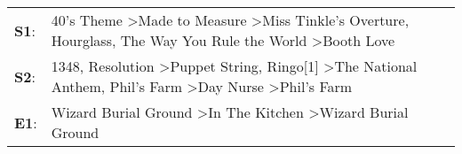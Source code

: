 \begin{supertabular}{p{0.03\textwidth}p{0.92\textwidth}}
 \textbf{S1}:  &                                                                 40's Theme\textsuperscript{} \textgreater \enspace Made to Measure\textsuperscript{} \textgreater \enspace Miss Tinkle's Overture\textsuperscript{}, \enspace Hourglass\textsuperscript{}, \enspace The Way You Rule the World\textsuperscript{} \textgreater \enspace Booth Love\textsuperscript{}  \enspace  \\
 \textbf{S2}:  &  1348\textsuperscript{}, \enspace Resolution\textsuperscript{} \textgreater \enspace Puppet String\textsuperscript{}, \enspace Ringo[1]\textsuperscript{} \textgreater \enspace The National Anthem\textsuperscript{}, \enspace Phil's Farm\textsuperscript{} \textgreater \enspace Day Nurse\textsuperscript{} \textgreater \enspace Phil's Farm\textsuperscript{}  \enspace  \\
 \textbf{E1}:  &                                                                                                                                                                                                          Wizard Burial Ground\textsuperscript{} \textgreater \enspace In The Kitchen\textsuperscript{} \textgreater \enspace Wizard Burial Ground\textsuperscript{}  \enspace  \\
\end{supertabular}
